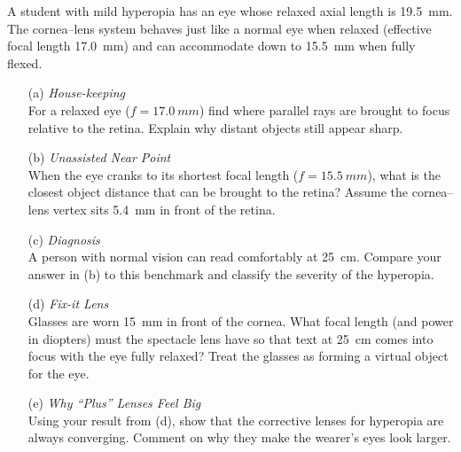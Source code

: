\begin{enumerate}
A student with mild hyperopia has an eye whose relaxed axial length is \SI{19.5}{mm}.  
The cornea–lens system behaves just like a normal eye when relaxed (effective focal length \SI{17.0}{mm}) and can accommodate down to \SI{15.5}{mm} when fully flexed.

\begin{enumerate}
	\setlength\itemsep{1.5in}
	
	\item[(a)] \emph{House-keeping}\\
	For a relaxed eye ($f=\SI{17.0}{mm}$) find where parallel rays are brought to focus relative to the retina. Explain why distant objects still appear sharp.
	
	\item[(b)] \emph{Unassisted Near Point}\\
	When the eye cranks to its shortest focal length ($f=\SI{15.5}{mm}$), what is the closest object distance that can be brought to the retina? Assume the cornea–lens vertex sits \SI{5.4}{mm} in front of the retina.
	
	\item[(c)] \emph{Diagnosis}\\
	A person with normal vision can read comfortably at \SI{25}{cm}. Compare your answer in (b) to this benchmark and classify the severity of the hyperopia.
	
	\item[(d)] \emph{Fix-it Lens}\\
	Glasses are worn \SI{15}{mm} in front of the cornea. What focal length (and power in diopters) must the spectacle lens have so that text at \SI{25}{cm} comes into focus with the eye fully relaxed? Treat the glasses as forming a virtual object for the eye.
	
	\item[(e)] \emph{Why “Plus” Lenses Feel Big}\\
	Using your result from (d), show that the corrective lenses for hyperopia are always converging. Comment on why they make the wearer’s eyes look larger.
\end{enumerate}




\end{enumerate}
